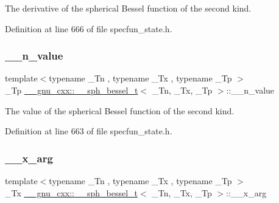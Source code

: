 The derivative of the spherical Bessel function of the second kind. 



Definition at line 666 of file specfun\+\_\+state.\+h.

\mbox{\label{struct____gnu__cxx_1_1____sph__bessel__t_ad846c3cb00bfabcbddc3e2f6512e3d7f}} 
\subsubsection{\texorpdfstring{\+\_\+\+\_\+n\+\_\+value}{\_\_n\_value}}
{\footnotesize\ttfamily template$<$typename \+\_\+\+Tn , typename \+\_\+\+Tx , typename \+\_\+\+Tp $>$ \\
\+\_\+\+Tp \hyperlink{struct____gnu__cxx_1_1____sph__bessel__t}{\+\_\+\+\_\+gnu\+\_\+cxx\+::\+\_\+\+\_\+sph\+\_\+bessel\+\_\+t}$<$ \+\_\+\+Tn, \+\_\+\+Tx, \+\_\+\+Tp $>$\+::\+\_\+\+\_\+n\+\_\+value}



The value of the spherical Bessel function of the second kind. 



Definition at line 663 of file specfun\+\_\+state.\+h.

\mbox{\label{struct____gnu__cxx_1_1____sph__bessel__t_afa9cf4b1888081bd21716c58ed19719b}} 
\subsubsection{\texorpdfstring{\+\_\+\+\_\+x\+\_\+arg}{\_\_x\_arg}}
{\footnotesize\ttfamily template$<$typename \+\_\+\+Tn , typename \+\_\+\+Tx , typename \+\_\+\+Tp $>$ \\
\+\_\+\+Tx \hyperlink{struct____gnu__cxx_1_1____sph__bessel__t}{\+\_\+\+\_\+gnu\+\_\+cxx\+::\+\_\+\+\_\+sph\+\_\+bessel\+\_\+t}$<$ \+\_\+\+Tn, \+\_\+\+Tx, \+\_\+\+Tp $>$\+::\+\_\+\+\_\+x\+\_\+arg}



